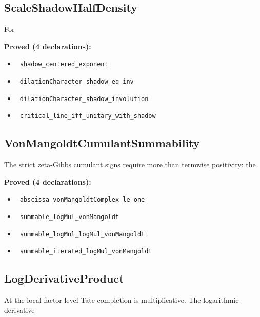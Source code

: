 \documentclass{report}
\theoremstyle{definition}
\begin{document}
\subsection{ScaleShadowHalfDensity}
For

\noindent\textbf{Proved (4 declarations):}
\begin{itemize}
  \item {}\leanok\ \texttt{shadow\_centered\_exponent}
  \item {}\leanok\ \texttt{dilationCharacter\_shadow\_eq\_inv}
  \item {}\leanok\ \texttt{dilationCharacter\_shadow\_involution}
  \item {}\leanok\ \texttt{critical\_line\_iff\_unitary\_with\_shadow}
\end{itemize}

\subsection{VonMangoldtCumulantSummability}
The strict zeta-Gibbs cumulant signs require more than termwise positivity: the

\noindent\textbf{Proved (4 declarations):}
\begin{itemize}
  \item {}\leanok\ \texttt{abscissa\_vonMangoldtComplex\_le\_one}
  \item {}\leanok\ \texttt{summable\_logMul\_vonMangoldt}
  \item {}\leanok\ \texttt{summable\_logMul\_logMul\_vonMangoldt}
  \item {}\leanok\ \texttt{summable\_iterated\_logMul\_vonMangoldt}
\end{itemize}

\subsection{LogDerivativeProduct}
At the local-factor level Tate completion is multiplicative.  The logarithmic derivative
\end{document}
